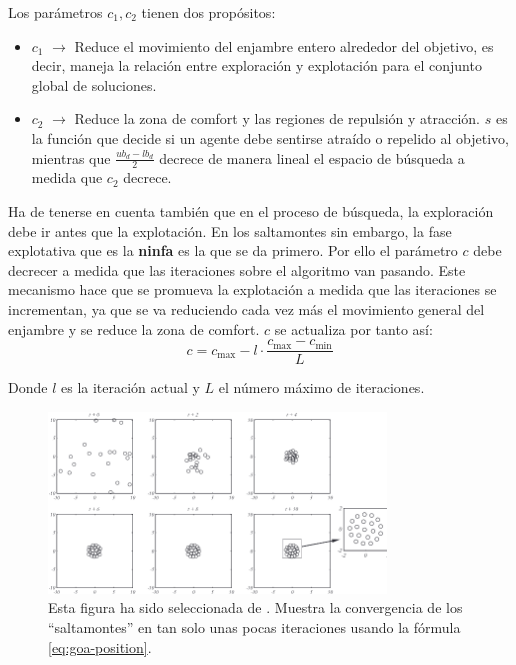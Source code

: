 Los parámetros $c_1, c_2$ tienen dos propósitos:
\begin{itemize}
    \item $c_1$ $\rightarrow$ Reduce el movimiento del enjambre entero alrededor del objetivo, es decir, maneja la relación entre exploración y explotación para el conjunto global de soluciones.
    \item $c_2$ $\rightarrow$ Reduce la zona de comfort y las regiones de repulsión y atracción. $s$ es la función que decide si un agente debe sentirse atraído o repelido al objetivo, mientras que $\frac{ub_d-lb_d}{2}$ decrece de manera lineal el espacio de búsqueda a medida que $c_2$ decrece.
\end{itemize}

Ha de tenerse en cuenta también que en el proceso de búsqueda, la exploración debe ir antes que la explotación. En los saltamontes sin embargo, la fase explotativa que es la \textbf{ninfa} es la que se da primero. Por ello el parámetro $c$ debe decrecer a medida que las iteraciones sobre el algoritmo van pasando. Este mecanismo hace que se promueva la explotación a medida que las iteraciones se incrementan, ya que se va reduciendo cada vez más el movimiento general del enjambre y se reduce la zona de comfort. $c$ se actualiza por tanto así:
\begin{equation}
    c = c_{\text{max}} - l \cdot \frac{c_{\text{max}} - c_{\text{min}}}{L}
\end{equation}

Donde $l$ es la iteración actual y $L$ el número máximo de iteraciones.

\begin{figure}[htp]
    \begin{center}
        \includegraphics[width=0.8\textwidth]{imagenes/goa-position-convergence.png}
    \end{center}
    \caption[Convergencia en GOA]{Esta figura ha sido seleccionada de \cite{saremi_grasshopper_2017}. Muestra la convergencia de los ``saltamontes'' en tan solo unas pocas iteraciones usando la fórmula \ref{eq:goa-position}.}
\end{figure}


